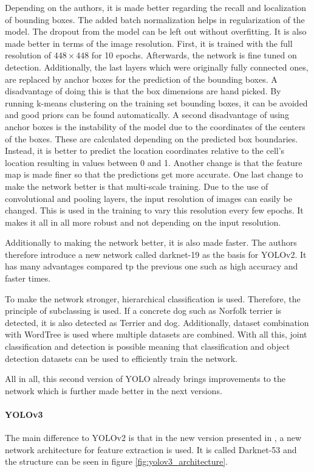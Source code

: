 Depending on the authors, it is made better regarding the recall and localization of bounding boxes. The added batch normalization helps in regularization of the model. The dropout from the model can be left out without overfitting. It is also made better in terms of the image resolution. First, it is trained with the full resolution of $ 448 \times 448 $ for 10 epochs. Afterwards, the network is fine tuned on detection. Additionally, the last layers which were originally fully connected ones, are replaced by anchor boxes for the prediction of the bounding boxes. A disadvantage of doing this is that the box dimensions are hand picked. By running k-means clustering on the training set bounding boxes, it can be avoided and good priors can be found automatically. A second disadvantage of using anchor boxes is the instability of the model due to the coordinates of the centers of the boxes. These are calculated depending on the predicted box boundaries. Instead, it is better to predict the location coordinates relative to the cell's location resulting in values between 0 and 1. Another change is that the feature map is made finer so that the predictions get more accurate. One last change to make the network better is that multi-scale training. Due to the use of convolutional and pooling layers, the input resolution of images can easily be changed. This is used in the training to vary this resolution every few epochs. It makes it all in all more robust and not depending on the input resolution.

Additionally to making the network better, it is also made faster. The authors therefore introduce a new network called darknet-19 as the basis for YOLOv2. It has many advantages compared tp the previous one such as high accuracy and faster times. 

To make the network stronger, hierarchical classification is used. Therefore, the principle of subclassing is used. If a concrete dog such as Norfolk terrier is detected, it is also detected as Terrier and dog. Additionally, dataset combination with WordTree is used where multiple datasets are combined. With all this, joint classification and detection is possible meaning that classification and object detection datasets can be used to efficiently train the network.

All in all, this second version of YOLO already brings improvements to the network which is further made better in the next versions.


\paragraph{YOLOv3}
The main difference to YOLOv2 is that in the new version presented in \cite{yolov3}, a new network architecture for feature extraction is used. It is called Darknet-53 and the structure can be seen in figure \ref{fig:yolov3_architecture}.

